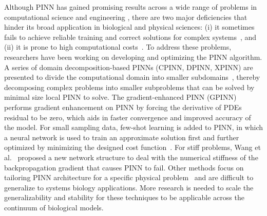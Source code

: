 Although PINN has gained promising results across a wide range of problems in computational science and engineering \cite{sun2020surrogate,raissi2019deep,jin2021nsfnets,kissas2020machine,sahli2020physics}, there are two major deficiencies that hinder its broad application in biological and physical sciences: (i) it sometimes fails to achieve reliable training and correct solutions for complex systems~\cite{krishnapriyan2021characterizing, lu2021deepxde, meng2022physics}, and (ii) it is prone to high computational costs~\cite{anantharaman2021stably,jagtap2020locally,jagtap2020conservative,lu2021learning}.
To address these problems, researchers have been working on developing and optimizing the PINN algorithm.
A series of domain decomposition-based PINNs (CPINN, DPINN, XPINN) are presented to divide the computational domain into smaller subdomains~\cite{dwivedi2019distributed, jagtap2020conservative, jagtap2021extended}, thereby decomposing complex problems into smaller subproblems that can be solved by minimal size local PINN to solve.
The gradient-enhanced PINN (GPINN)~\cite{yu2022gradient} performs gradient enhancement on PINN by forcing the derivative of PDEs residual to be zero, which aids in faster convergence and improved accuracy of the model.
For small sampling data, few-shot learning is added to PINN, in which a neural network is used to train an approximate solution first and further optimized by minimizing the designed cost function~\cite{li2021deep}. 
For stiff problems, Wang et al.~\cite{raissi2019physics} proposed a new network structure to deal with the numerical stiffness of the backpropagation gradient that causes PINN to fail.
Other methods focus on tailoring PINN architecture for a specific physical problem~\cite{wu2021modified, baddoo2021physics} and are difficult to generalize to systems biology applications.
More research is needed to scale the generalizability and stability for these techniques to be applicable across the continuum of biological models.

